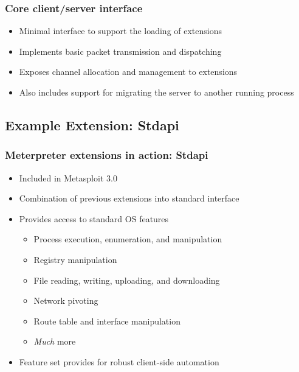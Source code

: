 \documentclass{beamer}
\newenvironment{sitemize}{\vspace{1mm}\begin{itemize}\itemsep 4pt\small}{\end{itemize}}
\begin{document}
\begin{frame}[t]
    \frametitle{Core client/server interface}

    \begin{sitemize}
        \item Minimal interface to support the loading of extensions

        \pause
        \item Implements basic packet transmission and dispatching
        \item Exposes channel allocation and management to
        extensions

        \pause
        \item Also includes support for migrating the server to
        another running process
    \end{sitemize}
\end{frame}

\subsection{Example Extension: Stdapi}

\begin{frame}[t]
    \frametitle{Meterpreter extensions in action: Stdapi}

    \begin{sitemize}
        \item Included in Metasploit 3.0
        \item Combination of previous extensions into standard
        interface

        \pause
        \item Provides access to standard OS features
        \begin{sitemize}
            \item Process execution, enumeration, and manipulation
            \item Registry manipulation
            \item File reading, writing, uploading, and downloading
            \item Network pivoting
            \item Route table and interface manipulation
            \item \emph{Much} more
        \end{sitemize}

        \pause
        \item Feature set provides for robust client-side automation
    \end{sitemize}
\end{frame}
\end{document}
